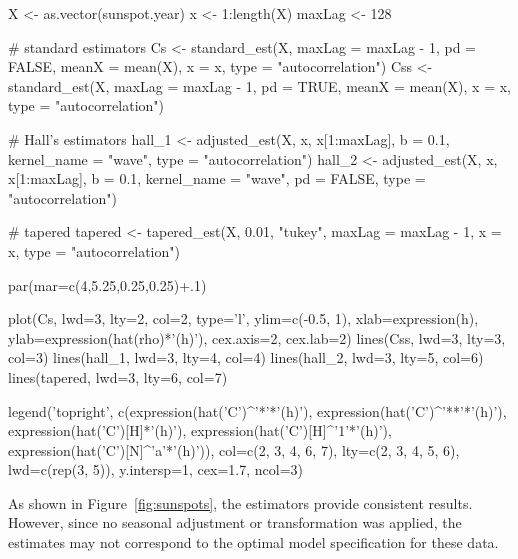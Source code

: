 \begin{example}
X <- as.vector(sunspot.year)
x <- 1:length(X)
maxLag <- 128

# standard estimators
Cs <- standard_est(X, maxLag = maxLag - 1, pd = FALSE, meanX = mean(X), x = x,
        type = "autocorrelation")
Css <- standard_est(X, maxLag = maxLag - 1, pd = TRUE, meanX = mean(X), x = x,
        type = "autocorrelation")

# Hall's estimators
hall_1 <- adjusted_est(X, x, x[1:maxLag], b = 0.1, kernel_name = "wave",
        type = "autocorrelation")
hall_2 <- adjusted_est(X, x, x[1:maxLag], b = 0.1, kernel_name = "wave", pd = FALSE,
        type = "autocorrelation")

# tapered
tapered <- tapered_est(X, 0.01, "tukey", maxLag = maxLag - 1, x = x,
        type = "autocorrelation")

par(mar=c(4,5.25,0.25,0.25)+.1)

plot(Cs, lwd=3, lty=2, col=2, type='l', ylim=c(-0.5, 1), xlab=expression(h),
        ylab=expression(hat(rho)*'(h)'), cex.axis=2, cex.lab=2)
lines(Css, lwd=3, lty=3, col=3)
lines(hall_1, lwd=3, lty=4, col=4)
lines(hall_2, lwd=3, lty=5, col=6)
lines(tapered, lwd=3, lty=6, col=7)

legend('topright', c(expression(hat('C')^'*'*'(h)'), expression(hat('C')^'**'*'(h)'),
        expression(hat('C')[H]*'(h)'), expression(hat('C')[H]^'1'*'(h)'),
        expression(hat('C')[N]^'a'*'(h)')), col=c(2, 3, 4, 6, 7),
        lty=c(2, 3, 4, 5, 6), lwd=c(rep(3, 5)), y.intersp=1, cex=1.7, ncol=3)
\end{example}

As shown in Figure~\ref{fig:sunspots}, the estimators provide consistent results. However, since no seasonal adjustment or transformation was applied, the estimates may not correspond to the optimal model specification for these data.


